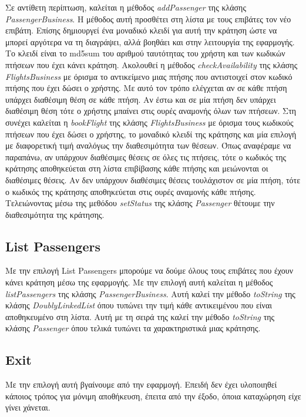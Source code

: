 \documentclass[a4paper]{article}
\begin{document}
Σε αντίθετη περίπτωση, καλείται η μέθοδος \emph{addPassenger} της κλάσης
\emph{PassengerBusiness}. Η μέθοδος αυτή προσθέτει στη λίστα με τους επιβάτες
τον νέο επιβάτη. Επίσης δημιουργεί ένα μοναδικό κλειδί για αυτή την κράτηση ώστε
να μπορεί αργότερα να τη διαγράψει, αλλά βοηθάει και στην λειτουργία της
εφαρμογής. Το κλειδί είναι το md5sum του αριθμού ταυτότητας του χρήστη και των
κωδικών πτήσεων που έχει κάνει κράτηση. Ακολουθεί η μέθοδος \emph{checkAvailability} της κλάσης
\emph{FlightsBusiness} με όρισμα το αντικείμενο μιας πτήσης που αντιστοιχεί στον
κωδικό πτήσης που έχει δώσει ο χρήστης. Με αυτό τον τρόπο ελέγχεται αν σε κάθε
πτήση υπάρχει διαθέσιμη θέση σε κάθε πτήση. Αν έστω και σε μία πτήση δεν υπάρχει
διαθέσιμη θέση τότε ο χρήστης μπαίνει στις ουρές αναμονής όλων των πτήσεων. Στη
συνέχει καλείται η \emph{bookFlight} της κλάσης \emph{FlightsBusiness} με όρισμα
τους κωδικούς πτήσεων που έχει δώσει ο χρήστης, το μοναδικό κλειδί της κράτησης
και μία επιλογή με διαφορετική τιμή αναλόγως την διαθεσιμότητα των θέσεων. Όπως
αναφέραμε να παραπάνω, αν υπάρχουν διαθέσιμες θέσεις σε όλες τις πτήσεις, τότε ο
κωδικός της κράτησης αποθηκεύεται στη λίστα επιβίβασης κάθε πτήσης και
μειώνονται οι διαθέσιμες θέσεις. Αν δεν υπάρχουν διαθέσιμες θέσεις τουλάχιστον
σε μία πτήση, τότε ο κωδικός της κράτησης αποθηκεύεται στις ουρές αναμονής κάθε
πτήσης. Τελειώνοντας μέσω της μεθόδου \emph{setStatus} της κλάσης
\emph{Passenger} θέτουμε την διαθεσιμότητα της κράτησης.

\subsection{List Passengers}
Με την επιλογή List Passengers μπορούμε να δούμε όλους τους επιβάτες που έχουν
κάνει κράτηση μέσω της εφαρμογής. Με την επιλογή αυτή καλείται η μέθοδος
\emph{listPassengers} της κλάσης \emph{PassengerBusiness}. Αυτή καλεί την μέθοδο
\emph{toString} της κλάσης \emph{DoublyLinkedList} όπου τυπώνει την τιμή κάθε
αντικειμένου που είναι αποθηκευμένο στη λίστα. Αυτή με τη σειρά της καλεί την
μέθοδο \emph{toString} της κλάσης \emph{Passenger} όπου τελικά τυπώνει τα
χαρακτηριστικά μιας κράτησης.

\subsection{Exit}
Με την επιλογή αυτή βγαίνουμε από την εφαρμογή. Επειδή δεν έχει υλοποιηθεί
κάποιος τρόπος για μόνιμη αποθήκευση, έπειτα από την έξοδο, όποια καταχώρηση
είχε γίνει χάνεται.
\end{document}
